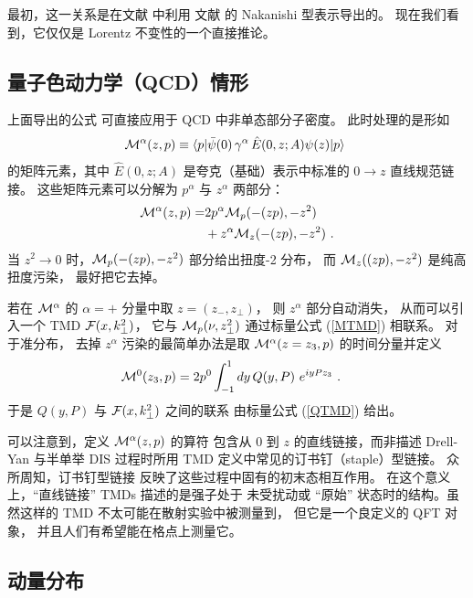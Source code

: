 最初，这一关系是在文献 \cite{Radyushkin:2016hsy} 中利用
文献 \cite{Radyushkin:2014vla,Radyushkin:2015gpa} 的 Nakanishi 型表示导出的。
现在我们看到，它仅仅是 Lorentz 不变性的一个直接推论。

\subsection{量子色动力学（QCD）情形}

上面导出的公式
可直接应用于 QCD 中非单态部分子密度。
此时处理的是形如
\begin{align}
{\cal M}^\alpha  (z,p) \equiv \langle  p |  \bar \psi (0) \,
\gamma^\alpha \,  { \hat E} (0,z; A) \psi (z) | p \rangle \
\label{Malpha}
\end{align}
的矩阵元素，其中 $
{ \hat E}(0,z; A)$ 是夸克（基础）表示中标准的 $0\to z$
直线规范链接。
这些矩阵元素可以分解为 $p^\alpha$ 与 $z^\alpha$ 两部分：
\begin{align}
{\cal M}^\alpha  (z,p) = &2 p^\alpha  {\cal M}_p (-(zp), -z^2)
\nonumber \\  & + z^\alpha  {\cal M}_z (-(zp),-z^2)
\ .
\end{align}
当 $z^2 \to 0$ 时，${\cal M}_p (-(zp), -z^2) $ 部分给出扭度-2 分布，
而 $ {\cal M}_z ((zp),-z^2)$ 是纯高扭度污染，
最好把它去掉。

若在 ${\cal M}^\alpha$ 的 $\alpha=+$ 分量中取 $z=(z_-, z_\perp)$，
则 $z^\alpha$ 部分自动消失，
从而可以引入一个 TMD ${\cal F}(x, k_\perp^2)$，
它与 $ {\cal M}_p (\nu, z_\perp^2)$ 通过标量公式
(\ref{MTMD}) 相联系。
对于准分布，
去掉 $z^\alpha$ 污染的最简单办法是取
\mbox{$ {\cal M}^\alpha  (z=z_3,p)$} 的时间分量并定义
\begin{align}
&  {\cal M}^0   (z_3,p)
=  2p^0
\int_{-1}^1 dy\,
Q(y,P) \,
\,  e^{i  y Pz_3 }  \  .
\label{OPhixspin12}
\end{align}
于是 $Q(y,P)$ 与
${\cal F}(x, k_\perp^2)$ 之间的联系
由标量公式 (\ref{QTMD}) 给出。

可以注意到，定义 $ {\cal M}^\alpha  (z,p) $ 的算符
包含从 $0$ 到 $z$ 的直线链接，而非描述
Drell-Yan 与半单举 DIS 过程时所用 TMD 定义中常见的订书钉（staple）型链接。
众所周知，订书钉型链接
反映了这些过程中固有的初末态相互作用。
在这个意义上，``直线链接'' TMDs 描述的是强子处于
未受扰动或 ``原始'' 状态时的结构。虽然这样的 TMD
不太可能在散射实验中被测量到，
但它是一个良定义的 QFT 对象，
并且人们有希望能在格点上测量它。

\subsection{动量分布}

